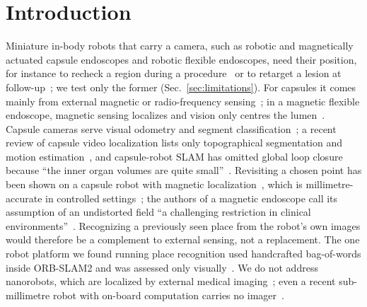 \section{Introduction}
\label{sec:intro}

Miniature in-body robots that carry a camera, such as robotic and
magnetically actuated capsule endoscopes and robotic flexible endoscopes,
need their position, for instance to recheck a region during a
procedure~\cite{ma2021colon10k} or to retarget a lesion at
follow-up~\cite{bianchi2019localization}; we test only the former
(Sec.~\ref{sec:limitations}). For capsules it comes mainly from
external magnetic or radio-frequency
sensing~\cite{bianchi2019localization,cao2024robotic}; in a magnetic flexible
endoscope, magnetic sensing localizes and vision only centres the
lumen~\cite{martin2020enabling}. Capsule cameras serve visual odometry and
segment classification~\cite{herp2021feature}; a recent review
of capsule video localization lists only topographical segmentation and
motion estimation~\cite{cao2024robotic}, and capsule-robot SLAM has omitted
global loop closure because ``the inner organ volumes are quite
small''~\cite{turan2017nonrigid}. Revisiting a chosen point has been shown on
a capsule robot with magnetic localization~\cite{xu2022autonomous}, which is
millimetre-accurate in controlled settings~\cite{cao2024robotic}; the authors
of a magnetic endoscope call its assumption of an undistorted field ``a
challenging restriction in clinical environments''~\cite{martin2020enabling}. Recognizing a previously seen place
from the robot's own images would therefore be a complement to external
sensing, not a replacement. The one robot platform we found running place
recognition used handcrafted bag-of-words inside ORB-SLAM2 and was assessed
only visually~\cite{prendergast2018autonomous}. We do not address
nanorobots, which are localized by external medical
imaging~\cite{aziz2020medical}; even a recent sub-millimetre robot with
on-board computation carries no imager~\cite{lassiter2025microscopic}.

